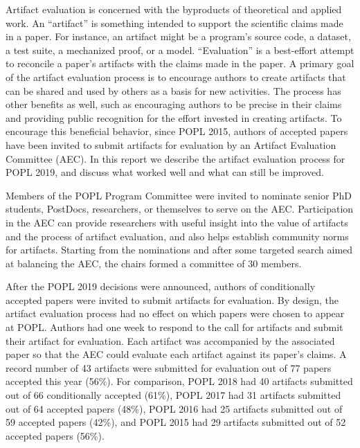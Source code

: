 \label{aec}

Artifact evaluation is concerned with
the byproducts of theoretical and applied work. An ``artifact'' is something
intended to support the scientific claims made in a paper. For instance, an
artifact might be a program’s source code, a dataset, a test suite, a mechanized
proof, or a model. ``Evaluation'' is a best-effort attempt to reconcile a paper’s
artifacts with the claims made in the paper. A primary goal of the artifact
evaluation process is to encourage authors to create artifacts that can be
shared and used by others as a basis for new activities. The process has other
benefits as well, such as encouraging authors to be precise in their claims and
providing public recognition for the effort invested in creating artifacts. To
encourage this beneficial behavior, since POPL 2015, authors of accepted papers
have been invited to submit artifacts for evaluation by an Artifact Evaluation
Committee (AEC). In this report we describe the artifact evaluation process
for POPL 2019, and discuss what worked well and what can still be improved.

Members of the POPL Program Committee were invited to nominate senior PhD
students, PostDocs, researchers, or themselves to serve on the AEC.
Participation in the AEC can provide researchers with useful insight into the
value of artifacts and the process of artifact evaluation, and also helps
establish community norms for artifacts. Starting from the nominations and after
some targeted search aimed at balancing the AEC, the chairs formed a committee
of 30 members.

After the POPL 2019 decisions were announced, authors of conditionally accepted
papers were invited to submit artifacts for evaluation. By design, the artifact
evaluation process had no effect on which papers were chosen to appear at POPL.
Authors had one week to respond to the call for artifacts and submit their
artifact for evaluation.
Each artifact was accompanied by the associated paper so that the AEC
could evaluate each artifact against its paper's claims. A record
number of 43 artifacts were submitted for evaluation out of 77 papers
accepted this year (56\%). For comparison,
POPL 2018 had 40 artifacts submitted out of 66 conditionally accepted (61\%),
POPL 2017 had 31 artifacts submitted out of 64 accepted papers (48\%),
POPL 2016 had 25 artifacts submitted out of 59 accepted papers (42\%), and
POPL 2015 had 29 artifacts submitted out of 52 accepted papers (56\%).

